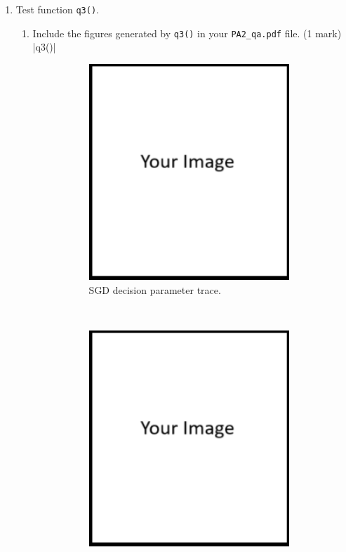 \documentclass{article}
\theoremstyle{definition}
\newtheorem*{answer}{Answer}
\begin{document}
\begin{enumerate}[label=\ref{partsgd}.\alph*]
\begin{enumerate}[label=\ref{q11b}.\roman*]
\begin{figure}[h]
\begin{subfigure}[t]{0.5\textwidth}
					\caption{SGD Loss vs. iteration.}
				\end{subfigure}
				\caption{Figures generated by .}
			\end{figure}
		\item When $\eta=0.05$, SGD would fail to converge to the optimal solution. What causes such behavior? (1 mark)
		\begin{answer}
			Your answer ...
		\end{answer}
	\end{enumerate}
	\newpage
	\item \label{q11c}Test function \verb|q3()|.
	\begin{enumerate}[label=\ref{q11c}.\roman*]
		\item Include the figures generated by \verb|q3()| in your \verb|PA2_qa.pdf| file. (1 mark)
			|q3()|
			\begin{figure}[h]
				\centering
				\begin{subfigure}[t]{0.5\textwidth}
					\centering
					\includegraphics[height=3.2in]{image.png}
					\caption{SGD decision parameter trace.}
				\end{subfigure}%
				~ 
				\begin{subfigure}[t]{0.5\textwidth}
					\centering
					\includegraphics[height=3.2in]{image.png}

\end{subfigure}
\end{figure}
\end{enumerate}
\end{enumerate}
\end{document}
